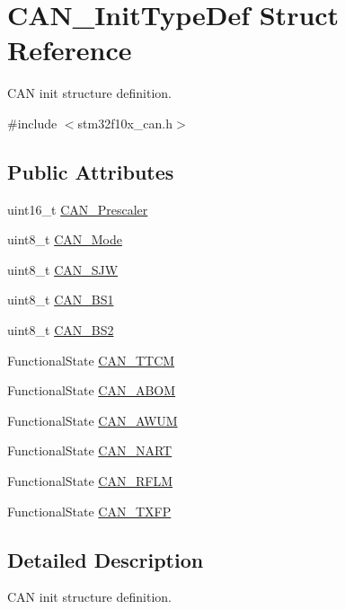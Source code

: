\hypertarget{structCAN__InitTypeDef}{
\section{CAN\_\-InitTypeDef Struct Reference}
\label{structCAN__InitTypeDef}
}


CAN init structure definition.  




{\ttfamily \#include $<$stm32f10x\_\-can.h$>$}

\subsection*{Public Attributes}
\begin{DoxyCompactItemize}
\item 
uint16\_\-t \hyperlink{structCAN__InitTypeDef_a3e91dbcbf30b893a9bd6a65606cb8fe9}{CAN\_\-Prescaler}
\item 
uint8\_\-t \hyperlink{structCAN__InitTypeDef_a24816ff18ae048a5ec4bbb22aa2c04f9}{CAN\_\-Mode}
\item 
uint8\_\-t \hyperlink{structCAN__InitTypeDef_addac271c43490cb37ac7293f7bf201c2}{CAN\_\-SJW}
\item 
uint8\_\-t \hyperlink{structCAN__InitTypeDef_aecbd21b55dc88c3a18db93af2836cd58}{CAN\_\-BS1}
\item 
uint8\_\-t \hyperlink{structCAN__InitTypeDef_a693eb00830d6e2aeb4d9fabdba85b9cf}{CAN\_\-BS2}
\item 
FunctionalState \hyperlink{structCAN__InitTypeDef_aa53ceafdcf1a9a5c9a6566006c9a4b60}{CAN\_\-TTCM}
\item 
FunctionalState \hyperlink{structCAN__InitTypeDef_a70560646c27d96ca8adc4a62d24dafd9}{CAN\_\-ABOM}
\item 
FunctionalState \hyperlink{structCAN__InitTypeDef_a10f873c858a7b0efc2d0ab41524320d3}{CAN\_\-AWUM}
\item 
FunctionalState \hyperlink{structCAN__InitTypeDef_a5adeac1b7b47f2b91e667eddc181ac09}{CAN\_\-NART}
\item 
FunctionalState \hyperlink{structCAN__InitTypeDef_aa63787683c0ad533b513fb60355d76f1}{CAN\_\-RFLM}
\item 
FunctionalState \hyperlink{structCAN__InitTypeDef_a003de4b70fc93b4f820f320c6ea75a16}{CAN\_\-TXFP}
\end{DoxyCompactItemize}


\subsection{Detailed Description}
CAN init structure definition. 

